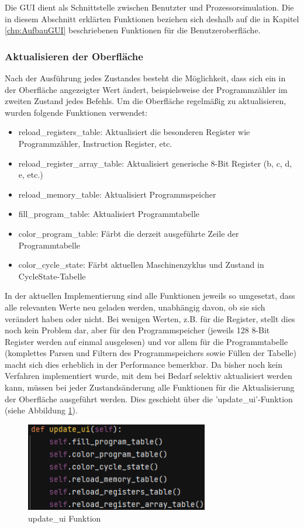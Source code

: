 \documentclass[12pt]{article}
\newcommand{\imgSpaceBefore}{\vspace{10pt}}
\begin{document}
\noindent
Die GUI dient als Schnittstelle zwischen Benutzter und Prozessorsimulation. Die in diesem Abschnitt erklärten Funktionen beziehen sich deshalb auf die in Kapitel \ref{chp:AufbauGUI} beschriebenen Funktionen für die Benutzeroberfläche.

\subsubsection{Aktualisieren der Oberfläche}
Nach der Ausführung jedes Zustandes besteht die Möglichkeit, dass sich ein in der Oberfläche angezeigter Wert ändert, beispielsweise der Programmzähler im zweiten Zustand jedes Befehls. Um die Oberfläche regelmäßig zu aktualisieren, wurden folgende Funktionen verwendet:\imgSpaceBefore

\begin{itemize}
	\item reload\_registers\_table: Aktualisiert die besonderen Register wie Programmzähler, Instruction Register, etc.
	\item reload\_register\_array\_table: Aktualisiert generische 8-Bit Register (b, c, d, e, etc.)
	\item reload\_memory\_table: Aktualisiert Programmspeicher
	\item fill\_program\_table: Aktualisiert Programmtabelle
	\item color\_program\_table: Färbt die derzeit ausgeführte Zeile der Programmtabelle
	\item color\_cycle\_state: Färbt aktuellen Maschinenzyklus und Zustand in CycleState-Tabelle
\end{itemize}
\noindent
In der aktuellen Implementierung sind alle Funktionen jeweils so umgesetzt, dass alle relevanten Werte neu geladen werden, unabhängig davon, ob sie sich verändert haben oder nicht. Bei wenigen Werten, z.B. für die Register, stellt dies noch kein Problem dar, aber für den Programmspeicher (jeweils 128 8-Bit Register werden auf einmal ausgelesen) und vor allem für die Programmtabelle (komplettes Parsen und Filtern des Programmspeichers sowie Füllen der Tabelle) macht sich dies erheblich in der Performance bemerkbar. Da bisher noch kein Verfahren implementiert wurde, mit dem bei Bedarf selektiv aktualisiert werden kann, müssen bei jeder Zustandsänderung alle Funktionen für die Aktualisierung der Oberfläche ausgeführt werden. Dies geschieht über die 'update\_ui'-Funktion (siehe Abbildung \ref{fig:updateUI}).\imgSpaceBefore

\begin{figure}[H]
\centering
\includegraphics[width=8cm]{bilder/updateUI}
\caption{update\_ui Funktion}
\label{fig:updateUI}
\end{figure}
\end{document}
